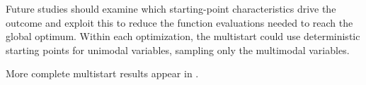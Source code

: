 \ifdefined\DISSERTATION
    
    Future studies should examine which starting-point characteristics drive the outcome
    and exploit this to reduce the function evaluations needed to reach the global optimum.
    Within each optimization, the multistart could use deterministic starting points for unimodal variables, %
    sampling only the multimodal variables.
\else

\fi
More complete multistart results appear in .

